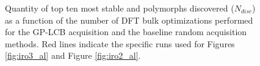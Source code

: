 

\begin{figure}[!htb]
\centering
{}
\caption{\label{fig:disc_rate}
%
Quantity of top ten most stable \IrOtwo and \IrOthree polymorphs discovered ($N_{disc}$) as a function of the number of DFT bulk optimizations performed for the GP-LCB acquisition and the baseline random acquisition methods.
%
Red lines indicate the specific runs used for Figures \ref{fig:iro3_al} and Figure \ref{fig:iro2_al}.
}
\end{figure}


%
%
%
%


